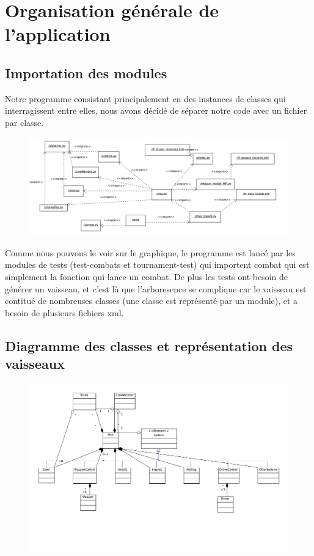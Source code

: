 \chapter{Organisation générale de l'application}

\section{Importation des modules}

	Notre programme consistant principalement en des instances de classes qui interragissent entre elles, nous avons décidé de séparer notre code avec un fichier par classe.

	\begin{figure}[H]
		\centering
		\includegraphics[width=1\linewidth]{smoothPackageDiagram}
	\end{figure}
	
	Comme nous pouvons le voir sur le graphique, le programme est lancé par les modules de tests (test-combats et tournament-test) qui importent combat qui est simplement la fonction qui lance un combat. De plus les tests ont besoin de générer un vaisseau, et c'est là que l'arboresence se complique car le vaisseau est contitué de nombreuses classes (une classe est représenté par un module), et a besoin de plusieurs fichiers xml.


\section{Diagramme des classes et représentation des vaisseaux}

	\begin{figure}[H]
		\centering
		\includegraphics[width=1\linewidth]{smoothUmlDiagram}
	\end{figure}

